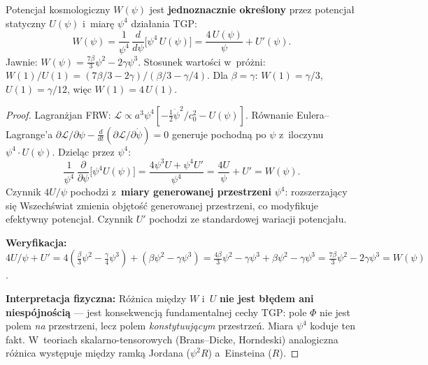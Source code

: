 \begin{proposition}%
\label{prop:W-from-U}
Potencja\l{} kosmologiczny $W(\psi)$ jest \textbf{jednoznacznie okre\'slony}
przez potencja\l{} statyczny $U(\psi)$ i~miar\k{e} $\psi^4$ dzia\l{}ania TGP:
\begin{equation}\label{eq:W-from-U}
  \boxed{
    W(\psi) = \frac{1}{\psi^4}\,\frac{d}{d\psi}\bigl[\psi^4\,U(\psi)\bigr]
    = \frac{4\,U(\psi)}{\psi} + U'(\psi).
  }
\end{equation}
Jawnie: $W(\psi) = \frac{7\beta}{3}\psi^2 - 2\gamma\psi^3$.
Stosunek warto\'sci w~pr\'o\.zni: $W(1)/U(1) = (7\beta/3 - 2\gamma)/(\beta/3 - \gamma/4)$.
Dla $\beta = \gamma$: $W(1) = \gamma/3$, $U(1) = \gamma/12$, wi\k{e}c $W(1) = 4\,U(1)$.
\end{proposition}

\begin{proof}
Lagran\.zjan FRW: $\mathcal{L} \propto a^3\psi^4[-\frac{1}{2}\dot\psi^2/c_0^2 - U(\psi)]$.
R\'ownanie Eulera--Lagrange'a $\partial\mathcal{L}/\partial\psi
- \frac{d}{dt}(\partial\mathcal{L}/\partial\dot\psi) = 0$
generuje pochodn\k{a} po $\psi$ z~iloczynu $\psi^4 \cdot U(\psi)$.
Dziel\k{a}c przez $\psi^4$:
\[
  \frac{1}{\psi^4}\,\frac{\partial}{\partial\psi}\bigl[\psi^4 U(\psi)\bigr]
  = \frac{4\psi^3 U + \psi^4 U'}{\psi^4}
  = \frac{4U}{\psi} + U'
  = W(\psi).
\]
Czynnik $4U/\psi$ pochodzi z~\textbf{miary generowanej przestrzeni} $\psi^4$:
rozszerzaj\k{a}cy si\k{e} Wszech\'swiat zmienia obj\k{e}to\'s\'c
generowanej przestrzeni, co modyfikuje efektywny potencja\l{}.
Czynnik $U'$ pochodzi ze standardowej wariacji potencja\l{}u.

\medskip\noindent\textbf{Weryfikacja:}
$4U/\psi + U' = 4(\tfrac{\beta}{3}\psi^2 - \tfrac{\gamma}{4}\psi^3)
+ (\beta\psi^2 - \gamma\psi^3)
= \tfrac{4\beta}{3}\psi^2 - \gamma\psi^3 + \beta\psi^2 - \gamma\psi^3
= \tfrac{7\beta}{3}\psi^2 - 2\gamma\psi^3 = W(\psi)$. \checkmark

\medskip\noindent\textbf{Interpretacja fizyczna:}
R\'o\.znica mi\k{e}dzy $W$ i~$U$ \textbf{nie jest b\l{}\k{e}dem ani
niesp\'ojno\'sci\k{a}} --- jest konsekwencj\k{a} fundamentalnej cechy TGP:
pole $\Phi$ nie jest polem \emph{na} przestrzeni, lecz polem
\emph{konstytuuj\k{a}cym} przestrze\'n. Miara $\psi^4$ koduje ten fakt.
W~teoriach skalarno-tensorowych (Brans--Dicke, Horndeski)
analogiczna r\'o\.znica wyst\k{e}puje mi\k{e}dzy ramk\k{a}
Jordana ($\psi^2 R$) a~Einsteina ($R$).
\end{proof}

